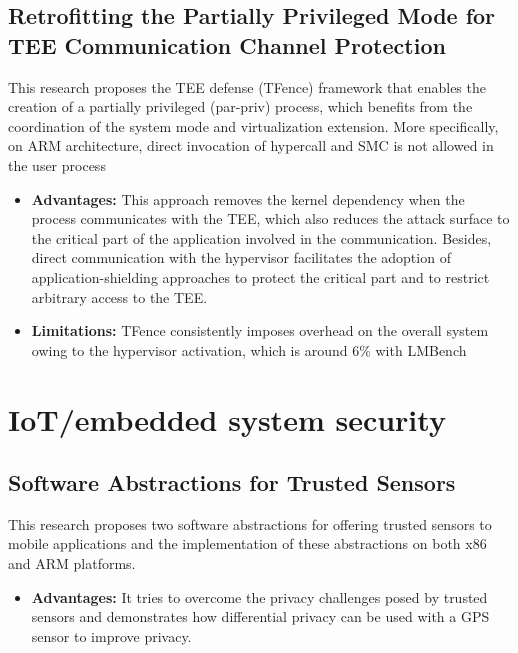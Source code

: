 \documentclass[conference]{IEEEtran}
\begin{document}
\subsection{Retrofitting the Partially Privileged Mode for TEE Communication Channel Protection}

\cite{mobile9} This research proposes the TEE defense (TFence) framework that enables the creation of a partially privileged (par-priv) process, which benefits from the coordination of the system mode and virtualization extension. More specifically, on ARM architecture, direct invocation of hypercall and SMC is not allowed in the user process
\begin{itemize}
    \item \textbf{Advantages:} This approach removes the kernel dependency when the process communicates with the TEE, which also reduces the attack surface to the critical part of the application involved in the communication. Besides, direct communication with the hypervisor facilitates the adoption of application-shielding approaches to protect the critical part and to restrict arbitrary access to the TEE.
    \item \textbf{Limitations:} TFence consistently imposes overhead on the overall system owing to the hypervisor activation, which is around $6\%$ with LMBench
\end{itemize}


\section{IoT/embedded system security}


\subsection{Software Abstractions for Trusted Sensors}
\cite{emb1} This research proposes two software abstractions for offering trusted sensors to mobile applications and the implementation of these abstractions on both x86 and ARM platforms.
\begin{itemize}
    \item \textbf{Advantages:} It tries to overcome the privacy challenges posed by trusted sensors and demonstrates how differential privacy can be used with a GPS sensor to improve privacy.
\end{itemize}
\end{document}
